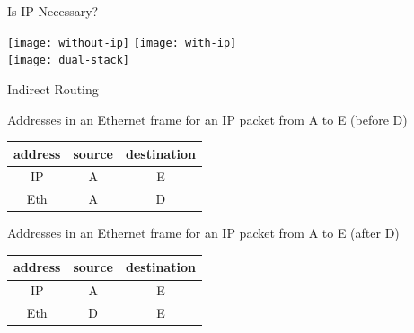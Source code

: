 \begin{frame}{Is IP Necessary?}
  \begin{center}
    \texttt{[image: without-ip]}\qquad
    \texttt{[image: with-ip]}\\[1em]
    \texttt{[image: dual-stack]}
  \end{center}
\end{frame}

\begin{frame}{Indirect Routing}
  \begin{center}
  \end{center}
  \label{fig:indirect-routing}
\end{frame}

\begin{frame}
  \begin{block}{Addresses in an Ethernet frame for an IP packet from A to E (before D)}
    \begin{center}
      \begin{tabular}{ccc}
        \toprule
        address & source & destination\\\midrule
        IP & A & E \\
        Eth & A & D \\\bottomrule
      \end{tabular}
    \end{center}
  \end{block}
  \begin{block}{Addresses in an Ethernet frame for an IP packet from A to E (after D)}
    \begin{center}
      \begin{tabular}{ccc}
        \toprule
        address & source & destination\\\midrule
        IP & A & E \\
        Eth & D & E \\\bottomrule
      \end{tabular}
    \end{center}
  \end{block}
\end{frame}


